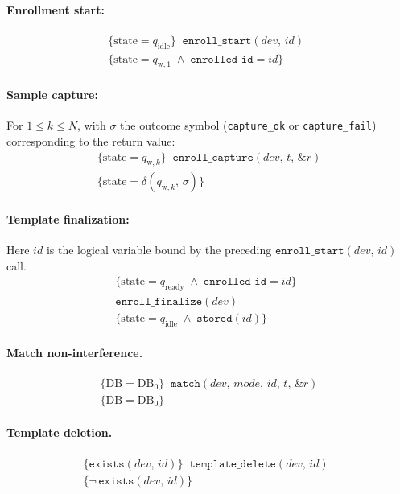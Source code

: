 \paragraph{Enrollment start:}
\begin{multline}
  \{\mathrm{state} = q_{\mathrm{idle}}\}\;\;
  \mathtt{enroll\_start}(\mathit{dev},\,\mathit{id})\;\; \\
  \{\mathrm{state} = q_{\mathrm{w},1} \;\wedge\; \mathtt{enrolled\_id} = \mathit{id}\}
\end{multline}

\paragraph{Sample capture:} For $1 \le k \le N$, with $\sigma$
the outcome symbol (\texttt{capture\_ok} or \texttt{capture\_fail}) corresponding to the return value:
\begin{multline}
  \{\mathrm{state} = q_{\mathrm{w},k}\}\;\;
  \mathtt{enroll\_capture}(\mathit{dev},\,t,\,\&r)\\
  \{\mathrm{state} = \delta(q_{\mathrm{w},k},\,\sigma)\}
\end{multline}

\paragraph{Template finalization:}
Here $\mathit{id}$ is the logical variable bound by the preceding $\mathtt{enroll\_start}(\mathit{dev},\,\mathit{id})$ call.
\begin{multline}
  \{\mathrm{state} = q_{\mathrm{ready}}
   \;\wedge\; \mathtt{enrolled\_id} = \mathit{id}\}\;\; \\
  \mathtt{enroll\_finalize}(\mathit{dev})\\
  \{\mathrm{state} = q_{\mathrm{idle}}
   \;\wedge\; \mathtt{stored}(\mathit{id})\}
\end{multline}

\paragraph{Match non-interference.}
\begin{multline}
  \{\mathrm{DB} = \mathrm{DB}_0\}\;\;
  \mathtt{match}(\mathit{dev},\,\mathit{mode},\,\mathit{id},\,t,\,\&r)\\
  \{\mathrm{DB} = \mathrm{DB}_0\}
\end{multline}

\paragraph{Template deletion.}
\begin{multline}
  \{\mathtt{exists}(\mathit{dev},\,\mathit{id})\}\;\;
  \mathtt{template\_delete}(\mathit{dev},\,\mathit{id})\;\; \\
  \{\neg\,\mathtt{exists}(\mathit{dev},\,\mathit{id})\}
\end{multline}


